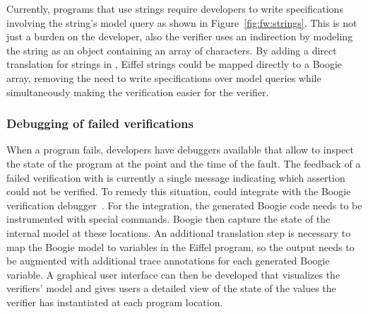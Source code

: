 Currently, programs that use strings require developers to write specifications involving the string's model query as shown in Figure~\ref{fig:fw:strings}.
This is not just a burden on the developer, also the verifier uses an indirection by modeling the string as an object containing an array of characters.
By adding a direct translation for strings in \AutoProof, Eiffel strings could be mapped directly to a Boogie array, removing the need to write specifications over model queries while simultaneously making the verification easier for the verifier.


\subsubsection{Debugging of failed verifications}

When a program fails, developers have debuggers available that allow to inspect the state of the program at the point and the time of the fault.
The feedback of a failed verification with \AutoProof is currently a single message indicating which assertion could not be verified.
To remedy this situation, \AutoProof could integrate with the Boogie verification debugger~\cite{GOUES11}.
For the integration, the generated Boogie code needs to be instrumented with special commands.
Boogie then capture the state of the internal model at these locations.
An additional translation step is necessary to map the Boogie model to variables in the Eiffel program, so the \AutoProof output needs to be augmented with additional trace annotations for each generated Boogie variable.
A graphical user interface can then be developed that visualizes the verifiers' model and gives users a detailed view of the state of the values the verifier has instantiated at each program location.



